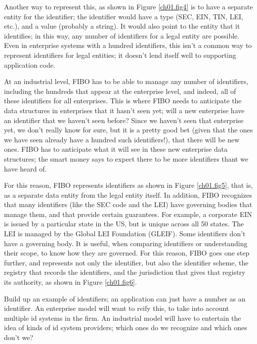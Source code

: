 Another way to represent this, as shown in Figure \ref{ch01.fig4} is to have a separate entity for the identifier;  the identifier would have a type (SEC, EIN, TIN, LEI, etc.), and a value (probably a string).  It would also point to the entity that it identifies; in this way, any number of identifiers for a legal entity are possible.  Even in enterprise systems with a hundred identifiers, this isn't a common way to represent identifiers for legal entities; it doesn't lend itself well to supporting application code.  

At an industrial level, FIBO has to be able to manage any number of identifiers, including the hundreds that appear at the enterprise level, and indeed, all of these identifiers for all enterprises.  This is where FIBO needs to anticipate the data structures in enterprises that it hasn't seen yet; will a new enterprise have an identifier that we haven't seen before?  Since we haven't seen that enterprise yet, we don't really know for sure, but it is a pretty good bet (given that the ones we have seen already have a hundred such identifiers!), that there will be new ones.  FIBO has to anticipate what it will see in these new enterprise data structures; the smart money says to expect there to be more identifiers thant we have heard of. 

For this reason, FIBO represents identifiers as shown in Figure \ref{ch01.fig5}, that is, as a separate data entity from the legal entity itself.  In addition, FIBO recognizes that many identifiers (like the SEC code and the LEI) have governing bodies that manage them, and that provide certain guarantees.  For example, a corporate EIN is issued by a particular state in the US, but is unique across all 50 states.  The LEI is managed by the Global LEI Foundation (GLEIF).  Some identifiers don't have a governing body.  It is useful, when comparing identifiers or understanding their scope, to know how they are governed.  For this reason, FIBO goes one step further, and represents not only the identifier, but also the identifier scheme, the registry that records the identifiers, and the jurisdiction that gives that registry its authority, as shown in Figure \ref{ch01.fig6}.






Build up an example of identifiers; an application can just have a number as an identifier.  An enterprise model will want to reify this, to take into account multiple id systems in the firm.  An industrial model will have to entertain the idea of kinds of id system providers; which ones do we recognize and which ones don't we? 




